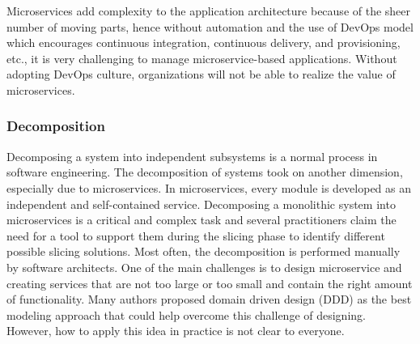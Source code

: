 Microservices add complexity to the application architecture because of the sheer number of moving parts, hence without automation and the use of DevOps model which encourages continuous integration, continuous delivery, and provisioning, etc., it is very challenging to manage microservice-based applications. Without adopting DevOps culture, organizations will not be able to realize the value of microservices.\cite{Premchand2018}



\subsubsection{Decomposition}%

Decomposing a system into independent subsystems is a normal process in software engineering.
The decomposition of systems took on another dimension, especially due to microservices.\cite{Netflix, Fred2015} In microservices, every module is developed as an independent and self-contained service. Decomposing a monolithic system into microservices is a critical and complex task and several practitioners claim the need for a tool to support them during the slicing phase to identify different possible slicing solutions.\cite{Taibi2019} Most often, the decomposition is performed manually by software architects.\cite{Zhang2019, Carvalho2019}
One of the main challenges is to design microservice and creating services that are not too large or too small and contain the right amount of functionality. Many authors proposed domain driven design (DDD) as the best modeling approach that could help overcome this challenge of designing. However, how to apply this idea in practice is not clear to everyone.\cite{Merson2020}




